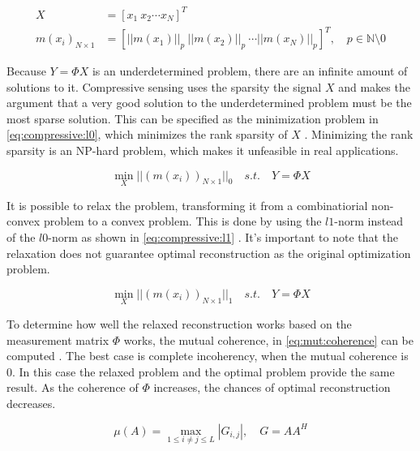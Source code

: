 \begin{equation} \label{eq:sparsity:measure}
  \begin{split}
      X &= [x_1\ x_2 \cdots x_N]^T \\
      m(x_i)_{N \times 1} &= [||m(x_1)||_p\ ||m(x_2)||_p\ \cdots ||m(x_N)||_p]^T,\quad p \in \mathbb{N}\setminus 0
  \end{split}
\end{equation}

Because $Y = \Phi X$ is an underdetermined problem, there are an infinite amount of solutions to it. Compressive sensing uses the sparsity the signal $X$ and makes the argument that a very good solution to the underdetermined problem must be the most sparse solution. This can be specified as the minimization problem in \eqref{eq:compressive:l0}, which minimizes the rank sparsity of $X$ \cite{chen:mmv}. Minimizing the rank sparsity is an NP-hard problem, which makes it unfeasible in real applications.

\begin{equation} \label{eq:compressive:l0}
  \min_{X} || (m(x_i))_{N \times 1} ||_0 \quad s.t. \quad Y = \Phi X
\end{equation}

It is possible to relax the problem, transforming it from a combinatiorial non-convex problem to a convex problem. This is done by using the $l1$-norm instead of the $l0$-norm as shown in \eqref{eq:compressive:l1} \cite{chen:mmv}. It's important to note that the relaxation does not guarantee optimal reconstruction as the original optimization problem. 

\begin{equation} \label{eq:compressive:l1}
    \min_{X} || (m(x_i))_{N \times 1} ||_1 \quad s.t. \quad Y = \Phi X
\end{equation}

To determine how well the relaxed reconstruction works based on the measurement matrix $\Phi$ works, the mutual coherence, in \eqref{eq:mut:coherence} can be computed \cite{chen:mmv}. The best case is complete incoherency, when the mutual coherence is 0. In this case the relaxed problem and the optimal problem provide the same result. As the coherence of $\Phi$ increases, the chances of optimal reconstruction decreases.

\begin{equation} \label{eq:mut:coherence}
    \mu(A) = \max_{1 \le i \neq j \le L} | G_{i,j} |,\quad G = AA^H
\end{equation}

